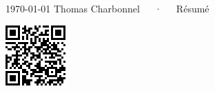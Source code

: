 \documentclass[11pt, a4paper]{awesome-cv}
\begin{document}
\vspace{2cm}
\makecvheader[C]

\makecvfooter
  {\today}
  {Thomas Charbonnel~~~·~~~Résumé}
  {\thepage}


\vspace{1cm}

\begin{minipage}[t]{.62\textwidth}
  
  
  
\end{minipage}\hfill\vline\hfill%
\begin{minipage}[t]{.34\textwidth}
  
  
  \vspace{5cm}
  \begin{center}
    \includegraphics{qrcode}
  \end{center}
\end{minipage}


\end{document}
